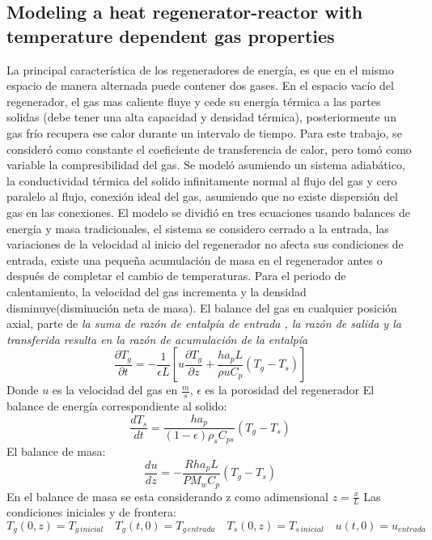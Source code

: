 \documentclass[12pt,letterpaper,final]{article}%
\begin{document}
\subsection*{Modeling a heat regenerator-reactor with temperature dependent gas properties}
La principal característica de los regeneradores de energía, es que en el mismo espacio de manera alternada puede contener dos gases. En el espacio vacío del regenerador, el gas mas caliente fluye y cede su energía térmica a las partes solidas (debe tener una alta capacidad y densidad térmica), posteriormente un gas frío recupera ese calor durante un intervalo de tiempo. Para este trabajo, se consideró como constante el coeficiente de transferencia de calor, pero tomó como variable la compresibilidad del gas. Se modeló asumiendo un sistema adiabático, la conductividad térmica del solido infinitamente normal al flujo del gas y cero paralelo al flujo, conexión ideal del gas, asumiendo que no existe dispersión del gas en las conexiones. El modelo se dividió en tres ecuaciones usando balances de energía y masa tradicionales, el sistema se considero cerrado a la entrada, las variaciones de la velocidad al inicio del regenerador no afecta sus condiciones de entrada, existe una pequeña acumulación de masa en el regenerador antes o después de completar el cambio de temperaturas. Para el periodo de calentamiento, la velocidad del gas incrementa y la densidad disminuye(disminución neta de masa). El balance del gas en cualquier posición axial, parte de \textit{la suma de razón de entalpía de entrada , la razón de salida y la transferida resulta en la razón de acumulación de la entalpía}\cite{Kulkarni1992} 
\begin{equation}
	\frac{\partial T_g}{\partial t} = -\frac{1}{\epsilon L}[u\frac{\partial T_g}{\partial z}+ \frac{ha_p L}{\rho u C_p}(T_g-T_s)]
\end{equation}
Donde $u$ es la velocidad del gas en $\frac{m}{s}$, $\epsilon$ es la porosidad del regenerador
\newline
El balance de energía correspondiente al solido:
\begin{equation}
	\frac{dT_s}{dt} = \frac{ha_p}{(1-\epsilon)\rho_s C_{ps}}(T_g-T_s)
\end{equation}
El balance de masa:
\begin{equation}
	\frac{du}{dz} = -\frac{Rha_pL}{PM_wC_p}(T_g-T_s)
\end{equation}
En el balance de masa se esta considerando z como adimensional $z=\frac{x}{L}$
\newline
Las condiciones iniciales y de frontera:
\begin{equation*}
	T_g(0,z)=T_{g \,inicial} \quad T_g(t,0)=T_{g \,entrada} \quad T_s(0,z)= T_{s \, inicial} \quad u(t,0) = u_{entrada}
\end{equation*}
\end{document}
